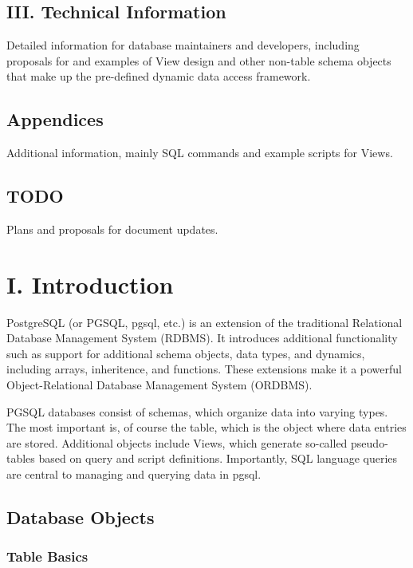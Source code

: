 \documentclass[]{article}
\begin{document}
\subsection{III. Technical
Information}\label{iii.-technical-information}

Detailed information for database maintainers and developers, including
proposals for and examples of View design and other non-table schema
objects that make up the pre-defined dynamic data access framework.

\subsection{Appendices}\label{appendices}

Additional information, mainly SQL commands and example scripts for
Views.

\subsection{TODO}\label{todo}

Plans and proposals for document updates.

\section{I. Introduction}\label{i.-introduction-1}

PostgreSQL (or PGSQL, pgsql, etc.) is an extension of the traditional
Relational Database Management System (RDBMS). It introduces additional
functionality such as support for additional schema objects, data types,
and dynamics, including arrays, inheritence, and functions. These
extensions make it a powerful Object-Relational Database Management
System (ORDBMS).

PGSQL databases consist of schemas, which organize data into varying
types. The most important is, of course the table, which is the object
where data entries are stored. Additional objects include Views, which
generate so-called pseudo-tables based on query and script definitions.
Importantly, SQL language queries are central to managing and querying
data in pgsql.

\subsection{Database Objects}\label{database-objects}

\subsubsection{Table Basics}\label{table-basics}
\end{document}
